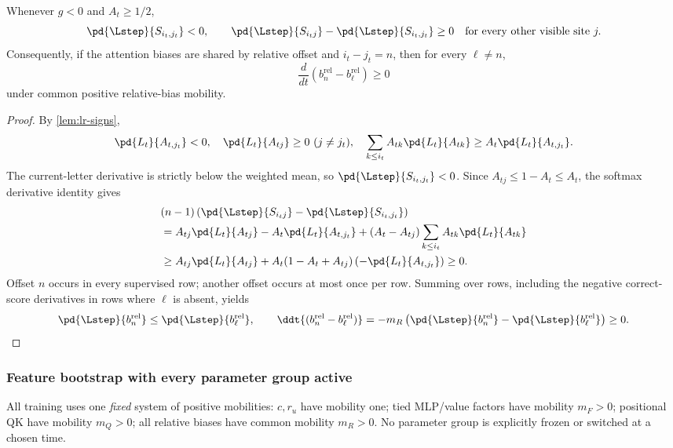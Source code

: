 \begin{lemma}
\label{lem:lr-postrouting-gradient}
Whenever $g<0$ and $A_t\ge1/2$,
\begin{equation}\label{eq:lr-score-comparison}
 \pd{\Lstep}{S_{i_t,j_t}}<0,\qquad \pd{\Lstep}{S_{i_tj}}-\pd{\Lstep}{S_{i_t,j_t}}\ge0
 \quad\text{for every other visible site }j.
\end{equation}
Consequently, if the attention biases are shared by relative offset and
$i_t-j_t=n$, then for every $\ell\ne n$,
\begin{equation}\label{eq:lr-bias-gap-mono}
 \frac{d}{dt}
 (b_n^{\mathrm{rel}}-b_\ell^{\mathrm{rel}})\ge0
\end{equation}
under common positive relative-bias mobility.
\end{lemma}
\begin{proof}
By \cref{lem:lr-signs},
\[
 \pd{L_t}{A_{t,j_t}}<0,\quad
 \pd{L_t}{A_{tj}}\ge0\ (j\ne j_t),\quad
 \sum_{k\le i_t}A_{tk}\pd{L_t}{A_{tk}}
 \ge A_t\pd{L_t}{A_{t,j_t}}.
\]
The current-letter derivative is strictly below the weighted mean, so
$\pd{\Lstep}{S_{i_t,j_t}}<0$.
Since $A_{tj}\le1-A_t\le A_t$, the softmax derivative identity gives
\begin{align*}
 &(n-1)\left(\pd{\Lstep}{S_{i_tj}}-\pd{\Lstep}{S_{i_t,j_t}}\right)\\
 &=A_{tj}\pd{L_t}{A_{tj}}-A_t\pd{L_t}{A_{t,j_t}}
 +(A_t-A_{tj})\sum_{k\le i_t}A_{tk}\pd{L_t}{A_{tk}}\\
 &\ge A_{tj}\pd{L_t}{A_{tj}}
 +A_t(1-A_t+A_{tj})\left(-\pd{L_t}{A_{t,j_t}}\right)\ge0.
\end{align*}
Offset $n$ occurs in every supervised row; another offset occurs at most once
per row. Summing over rows, including the negative correct-score derivatives
in rows where $\ell$ is absent, yields
\[
 \pd{\Lstep}{b_n^{\mathrm{rel}}}
 \le\pd{\Lstep}{b_\ell^{\mathrm{rel}}},\qquad
 \ddt{(b_n^{\mathrm{rel}}-b_\ell^{\mathrm{rel}})}
 =-m_R\left(\pd{\Lstep}{b_n^{\mathrm{rel}}}
 -\pd{\Lstep}{b_\ell^{\mathrm{rel}}}\right)\ge0.
\]
\end{proof}

\subsubsection{Feature bootstrap with every parameter group active}
\label{app:weak-routing-bootstrap}

All training uses one \emph{fixed} system of positive mobilities:
$c,r_u$ have mobility one; tied MLP/value factors have mobility
$m_F>0$; positional QK have mobility $m_Q>0$; all relative biases
have common mobility $m_R>0$.
No parameter group is explicitly frozen or switched at a chosen time.

